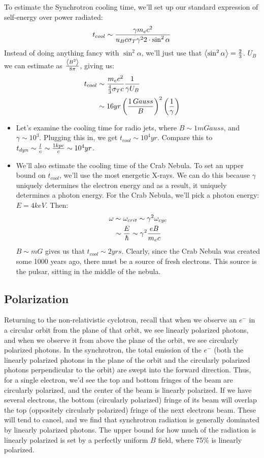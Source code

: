 \documentclass[11pt]{article}
\def\inv#1{{1 \over #1}}
\def\mean#1{\left\langle #1\right\rangle}
\begin{document}
To estimate the Synchrotron cooling time, we'll set up our standard expression
of self-energy over power radiated:
$$t_{cool}\sim{\gamma m_ec^2\over u_Bc\sigma_T\gamma^22\cdot\sin^2\alpha}$$
Instead of doing anything fancy with $\sin^2\alpha$, we'll just use that
$\mean{\sin^2\alpha}={2\over3}$.  $U_B$ we can estimate as $\mean{B^2}\over
8\pi$, giving us:
$$\begin{aligned}t_{cool}&\sim{m_ec^2\over{4\over3}\sigma_Tc}\inv{\gamma U_B}\\ 
&\sim16yr\left({1\,Gauss\over B}\right)^2\left(\inv{\gamma}\right)\\ \end{aligned}$$
\begin{itemize}
\item Let's examine the cooling time for radio jets, 
where $B\sim1mGauss$, 
and $\gamma\sim10^3$.  Plugging this in, we get $t_{cool}\sim10^4yr$.  Compare
this to $t_{dyn}\sim{l\over c}\sim{1kpc\over c}\sim10^4yr$.

\item We'll also estimate the cooling time of the Crab Nebula.  To set
an upper bound on $t_{cool}$, we'll use the most energetic X-rays.  We can
do this because $\gamma$ uniquely determines the electron energy and as a 
result, it uniquely determines a photon energy.  For the Crab Nebula, we'll
pick a photon energy: $E=4keV$.  Then:
$$\begin{aligned}\omega&\sim\omega_{crit}\sim\gamma^2\omega_{cyc}\\ 
&\sim{E\over\hbar}\sim\gamma^2{eB\over m_ec}\\ \end{aligned}$$
$B\sim mG$ gives us that $t_{cool}\sim2yrs$.  Clearly, since the Crab Nebula
was created some 1000 years ago, there must be a source of fresh electrons.
This source is the pulsar, sitting in the middle of the nebula.
\end{itemize}

\subsection*{ Polarization}

Returning to the non-relativistic cyclotron, recall that when we observe 
an $e^-$ in a circular orbit from the plane of that orbit, we see linearly
polarized photons, and when we observe it from above the plane of the
orbit, we see circularly polarized photons.  In the synchrotron, 
the total emission of the $e^-$ (both the linearly polarized photons
in the plane of the orbit and the circularly polarized photons perpendicular
to the orbit) are swept into the forward direction.  Thus, for a single
electron, we'd see the top and bottom fringes of the beam are circularly
polarized, and the center of the beam is linearly polarized.  If we have
several electrons, the bottom (circularly polarized) fringe of
its beam will overlap the top (oppositely circularly polarized) fringe
of the next electrons beam.  These will tend to cancel, and we find that
synchrotron radiation is generally dominated by linearly polarized photons.
The upper bound for how much of the radiation is linearly polarized is set by
a perfectly uniform $B$ field, where 75\% is linearly polarized.
\end{document}
